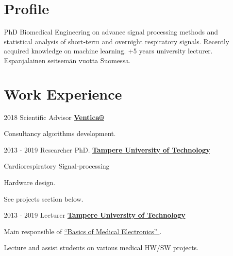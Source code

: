 \documentclass[letterpaper]{twentysecondcv} %
\begin{document}
\begin{RigthPage1}
\section{Profile}  
PhD Biomedical Engineering on advance signal processing methods and statistical analysis of short-term and overnight respiratory signals. Recently acquired knowledge on machine learning. +5 years university lecturer. Espanjalainen seitsemän vuotta Suomessa.  
\\
\section{Work Experience}        
\begin{twenty}
	\twentyitemlist
    	{2018}
        {Scientific Advisor}
        {\href{https://www.ventica.net/}{\textbf{Ventica®}}} 
        {
          \item Consultancy algorithms development.
        }
        
	\twentyitemlist
    	{2013 - 2019}
        {Researcher PhD.}
        {\href{https://www.tut.fi/}{\textbf{Tampere University of Technology}}}
        {
          \item Cardiorespiratory Signal-processing 
          \item Hardware design.
          \item See projects section below.
        }
        
	\twentyitemlist
    	{2013 - 2019}
        {Lecturer}
        {\href{https://www.tut.fi/}{\textbf{Tampere University of Technology}}}
        {
        \item Main responsible of 
\href{https://www.youtube.com/watch?time_continue=1&v=E3D8rAG6S4Q}{“Basics of Medical Electronics” }.
        \item Lecture and assist students on various medical HW/SW projects.        
        }


\end{twenty}
\end{RigthPage1}
\end{document}
